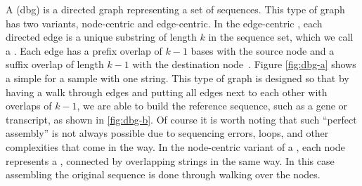 A \dbg (dbg) is a directed graph representing a set of sequences. This type of graph has two variants, node-centric and edge-centric. In the edge-centric \dbg, each directed edge is a unique substring of length $k$ in the sequence set, which we call a \kmer. Each edge has a prefix overlap of $k-1$ bases with the source node and a suffix overlap of length $k-1$ with the destination node~\cite{paten2017genome}. Figure \ref{fig:dbg-a} shows a simple \dbg for a sample with one string. This type of graph is designed so that by having a walk through edges and putting all edges next to each other with overlaps of $k-1$, we are able to build the reference sequence, such as a gene or transcript, as shown in \ref{fig:dbg-b}. Of course it is worth noting that such ``perfect assembly'' is not always possible due to sequencing errors, loops, and other complexities that come in the way. In the node-centric variant of a \dbg, each node represents a \kmer, connected by overlapping strings in the same way. In this case assembling the original sequence is done through walking over the nodes.

